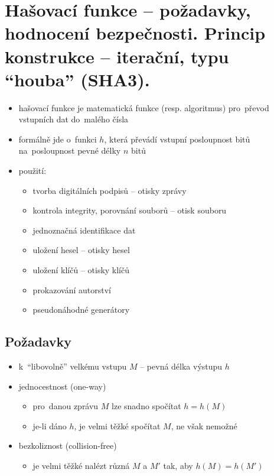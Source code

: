 \clearpage
\section{Hašovací funkce -- požadavky, hodnocení bezpečnosti. Princip konstrukce -- iterační, typu \enquote{houba} (SHA3).}
\begin{itemize}
    \item hašovací funkce je matematická funkce (resp. algoritmus) pro~převod vstupních dat do~malého čísla
    \item formálně jde o~funkci $h$, která převádí vstupní posloupnost bitů na~posloupnost pevné délky $n$ bitů
    \item použití:
    \begin{itemize}
        \item tvorba digitálních podpisů -- otisky zprávy
        \item kontrola integrity, porovnání souborů -- otisk souboru
        \item jednoznačná identifikace dat
        \item uložení hesel -- otisky hesel
        \item uložení klíčů -- otisky klíčů
        \item prokazování autorství
        \item pseudonáhodné generátory
    \end{itemize}
\end{itemize}

\subsection{Požadavky}
\begin{itemize}
    \item k~\enquote{libovolně} velkému vstupu $M$ -- pevná délka výstupu $h$
    \item jednocestnost (one-way)
    \begin{itemize}
        \item pro~danou zprávu $M$ lze snadno spočítat $h = h(M)$
        \item je-li dáno $h$, je velmi těžké spočítat $M$, ne však nemožné
    \end{itemize}
    \item bezkoliznost (collision-free)
    \begin{itemize}
        \item je velmi těžké nalézt různá $M$ a $M'$ tak, aby $h(M) = h(M')$
    \end{itemize}
\end{itemize}

